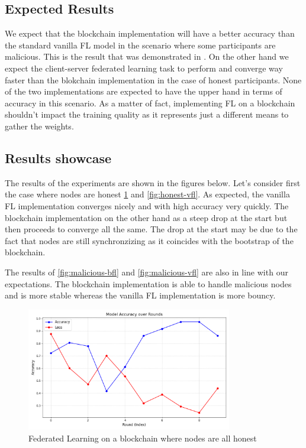 \subsection{Expected Results}
We expect that the blockchain implementation will have a better accuracy than the standard vanilla FL model
in the scenario where some participants are malicious. This is the result that was demonstrated in \cite{VBFL}.
On the other hand we expect the client-server federated learning task to perform and converge way faster than
the blokchain implementation in the case of honest participants. None of the two implementations are expected
to have the upper hand in terms of accuracy in this scenario. As a matter of fact, implementing FL on a
blockchain shouldn't impact the training quality as it represents just a different means to gather the weights.

\subsection{Results showcase}
The results of the experiments are shown in the figures below.
Let's consider first the case where nodes are honest \ref{fig:honest-bfl} and \ref{fig:honest-vfl}.
As expected, the vanilla FL implementation converges nicely and with high accuracy very quickly. The
blockchain implementation on the other hand as a steep drop at the start but then proceeds to converge all the same.
The drop at the start may be due to the fact that nodes are still synchronzizing as it coincides with the
bootstrap of the blockchain.

The results of \ref{fig:malicious-bfl} and \ref{fig:malicious-vfl} are also in line with our expectations.
The blockchain implementation is able to handle malicious nodes and is more stable whereas the vanilla FL
implementation is more bouncy.

\begin{figure}
  \centering
  \includegraphics[width=0.8\textwidth]{figures/ml/honest-bfl.png}
  \caption{Federated Learning on a blockchain where nodes are all honest}
  \label{fig:honest-bfl}
\end{figure}

